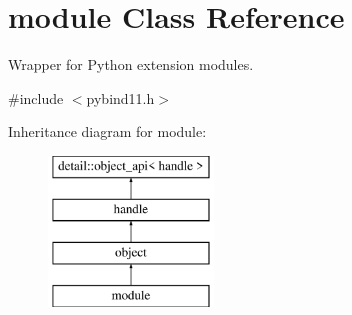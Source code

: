 \hypertarget{classmodule}{}\section{module Class Reference}
\label{classmodule}


Wrapper for Python extension modules.  




{\ttfamily \#include $<$pybind11.\+h$>$}

Inheritance diagram for module\+:\begin{figure}[H]
\begin{center}
\leavevmode
\includegraphics[height=4.000000cm]{classmodule}
\end{center}
\end{figure}
